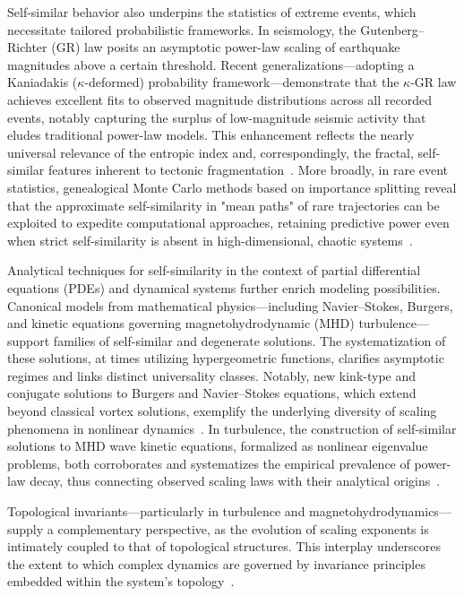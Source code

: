 \documentclass[sigconf]{acmart}
\begin{document}
Self-similar behavior also underpins the statistics of extreme events, which necessitate tailored probabilistic frameworks. In seismology, the Gutenberg–Richter (GR) law posits an asymptotic power-law scaling of earthquake magnitudes above a certain threshold. Recent generalizations—adopting a Kaniadakis ($\kappa$-deformed) probability framework—demonstrate that the $\kappa$-GR law achieves excellent fits to observed magnitude distributions across all recorded events, notably capturing the surplus of low-magnitude seismic activity that eludes traditional power-law models. This enhancement reflects the nearly universal relevance of the entropic index and, correspondingly, the fractal, self-similar features inherent to tectonic fragmentation~\cite{ref58}. More broadly, in rare event statistics, genealogical Monte Carlo methods based on importance splitting reveal that the approximate self-similarity in "mean paths" of rare trajectories can be exploited to expedite computational approaches, retaining predictive power even when strict self-similarity is absent in high-dimensional, chaotic systems~\cite{ref59}.

Analytical techniques for self-similarity in the context of partial differential equations (PDEs) and dynamical systems further enrich modeling possibilities. Canonical models from mathematical physics—including Navier–Stokes, Burgers, and kinetic equations governing magnetohydrodynamic (MHD) turbulence—support families of self-similar and degenerate solutions. The systematization of these solutions, at times utilizing hypergeometric functions, clarifies asymptotic regimes and links distinct universality classes. Notably, new kink-type and conjugate solutions to Burgers and Navier–Stokes equations, which extend beyond classical vortex solutions, exemplify the underlying diversity of scaling phenomena in nonlinear dynamics~\cite{ref67,ref64}. In turbulence, the construction of self-similar solutions to MHD wave kinetic equations, formalized as nonlinear eigenvalue problems, both corroborates and systematizes the empirical prevalence of power-law decay, thus connecting observed scaling laws with their analytical origins~\cite{ref60}.

Topological invariants—particularly in turbulence and magnetohydrodynamics—supply a complementary perspective, as the evolution of scaling exponents is intimately coupled to that of topological structures. This interplay underscores the extent to which complex dynamics are governed by invariance principles embedded within the system's topology~\cite{ref60}.
\end{document}
